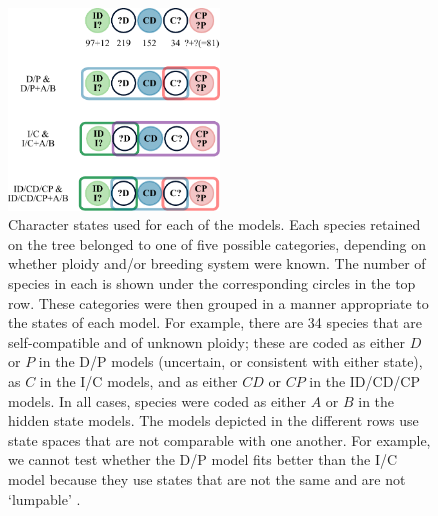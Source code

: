 \begin{figure}
\centering
\includegraphics[width=0.5\textwidth]{states.pdf}
\caption{
Character states used for each of the models.
Each species retained on the tree belonged to one of five possible categories, depending on whether ploidy and/or breeding system were known.
The number of species in each is shown under the corresponding circles in the top row. %
These categories were then grouped in a manner appropriate to the states of each model.
For example, there are 34 species that are self-compatible and of unknown ploidy; these are coded as either $D$ or $P$ in the D/P models (uncertain, or consistent with either state), as $C$ in the I/C models, and as either $CD$ or $CP$ in the ID/CD/CP models.
In all cases, species were coded as either $A$ or $B$ in the hidden state models.
The models depicted in the different rows use state spaces that are not comparable with one another.
For example, we cannot test whether the D/P model fits better than the I/C model because they use states that are not the same and are not `lumpable' \citep{tarasov_2019}.
}
\label{figure:stateclassifications}
\end{figure}


